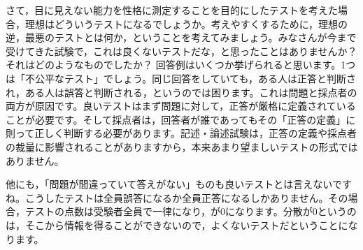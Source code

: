 \documentclass{ltjbook}
\begin{document}
さて，目に見えない能力を性格に測定することを目的にしたテストを考えた場合，理想はどういうテストになるでしょうか。考えやすくするために，理想の逆，最悪のテストとは何か，ということを考えてみましょう。みなさんが今まで受けてきた試験で，これは良くないテストだな，と思ったことはありませんか？ それはどのようなものでしたか？
回答例はいくつか挙げられると思います。1つは「不公平なテスト」でしょう。同じ回答をしていても，ある人は正答と判断され，ある人は誤答と判断される，というのでは困ります。これは問題と採点者の両方が原因です。良いテストはまず問題に対して，正答が厳格に定義されていることが必要です。そして採点者は，回答者が誰であってもその「正答の定義」に則って正しく判断する必要があります。記述・論述試験は，正答の定義や採点者の裁量に影響されることがありますから，本来あまり望ましいテストの形式ではありません。

他にも，「問題が間違っていて答えがない」ものも良いテストとは言えないですね。こうしたテストは全員誤答になるか全員正答になるしかありません。その場合，テストの点数は受験者全員で一律になり，が$0$になります。分散が$0$というのは，そこから情報を得ることができないので，よくないテストだということになります。
\end{document}
